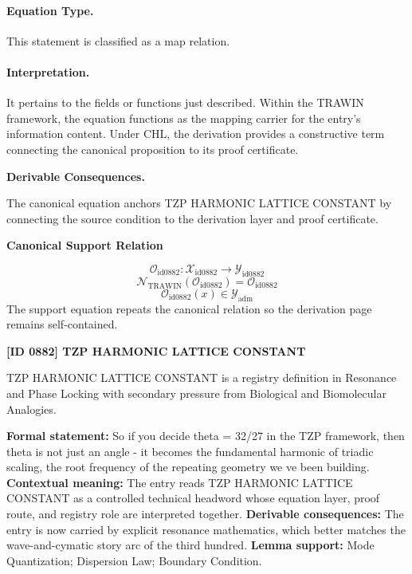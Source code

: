 \paragraph{Equation Type.}
This statement is classified as a map relation.

\paragraph{Interpretation.}
It pertains to the fields or functions just described. Within the TRAWIN framework, the equation functions as the mapping carrier for the entry’s information content. Under CHL, the derivation provides a constructive term connecting the canonical proposition to its proof certificate.

\par\vspace{0.35em}
\noindent\textbf{Derivable Consequences.}\quad
\begingroup
\footnotesize
\raggedright
The canonical equation anchors TZP HARMONIC LATTICE CONSTANT by connecting the source condition to the derivation layer and proof certificate.
\par\endgroup

\noindent\textbf{Canonical Support Relation}\par
\[
\mathcal{O}_{\mathrm{id0882}}:\mathcal{X}_{\mathrm{id0882}}\longrightarrow\mathcal{Y}_{\mathrm{id0882}}
\]
\[
\mathcal{N}_{\mathrm{TRAWIN}}(\mathcal{O}_{\mathrm{id0882}})=\mathcal{O}_{\mathrm{id0882}}
\]
\[
\mathcal{O}_{\mathrm{id0882}}(x)\in\mathcal{Y}_{\mathrm{adm}}
\]
\noindent The support equation repeats the canonical relation so the derivation page remains self-contained.\par

\clearpage
\noindent\textbf{[ID 0882] TZP HARMONIC LATTICE CONSTANT}\par
\vspace{0.35em}
\begingroup\small
{}
TZP HARMONIC LATTICE CONSTANT is a registry definition in Resonance and Phase Locking with secondary pressure from Biological and Biomolecular Analogies.

\begingroup\footnotesize\setlength{\emergencystretch}{3em}\sloppy
\textbf{Formal statement:} So if you decide theta = 32/27 in the TZP framework, then theta is not just an angle - it becomes the fundamental harmonic of triadic scaling, the root frequency of the repeating geometry we ve been building. \textbf{Contextual meaning:} The entry reads TZP HARMONIC LATTICE CONSTANT as a controlled technical headword whose equation layer, proof route, and registry role are interpreted together. \textbf{Derivable consequences:} The entry is now carried by explicit resonance mathematics, which better matches the wave-and-cymatic story arc of the third hundred. \textbf{Lemma support:} Mode Quantization; Dispersion Law; Boundary Condition.\par
\endgroup

